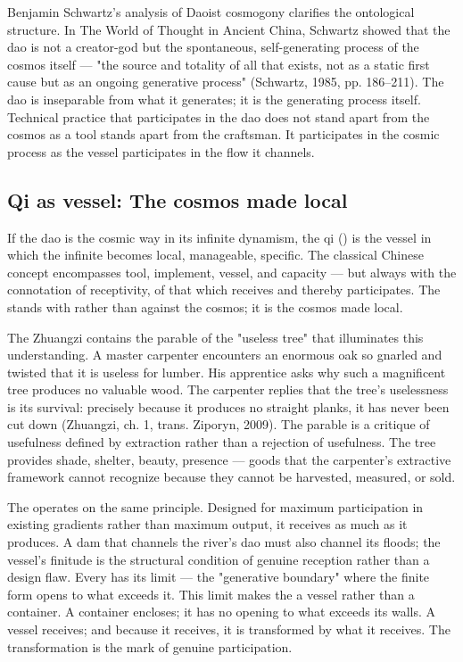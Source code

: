 Benjamin Schwartz's analysis of Daoist cosmogony clarifies the ontological structure. In The World of Thought in Ancient China, Schwartz showed that the dao is not a creator-god but the spontaneous, self-generating process of the cosmos itself — "the source and totality of all that exists, not as a static first cause but as an ongoing generative process" (Schwartz, 1985, pp. 186–211). The dao is inseparable from what it generates; it is the generating process itself. Technical practice that participates in the dao does not stand apart from the cosmos as a tool stands apart from the craftsman. It participates in the cosmic process as the vessel participates in the flow it channels.

\subsection{Qi as vessel: The cosmos made local}

If the dao is the cosmic way in its infinite dynamism, the qi () is the vessel in which the infinite becomes local, manageable, specific. The classical Chinese concept encompasses tool, implement, vessel, and capacity — but always with the connotation of receptivity, of that which receives and thereby participates. The  stands with rather than against the cosmos; it is the cosmos made local.

The Zhuangzi contains the parable of the "useless tree" that illuminates this understanding. A master carpenter encounters an enormous oak so gnarled and twisted that it is useless for lumber. His apprentice asks why such a magnificent tree produces no valuable wood. The carpenter replies that the tree's uselessness is its survival: precisely because it produces no straight planks, it has never been cut down (Zhuangzi, ch. 1, trans. Ziporyn, 2009). The parable is a critique of usefulness defined by extraction rather than a rejection of usefulness. The tree provides shade, shelter, beauty, presence — goods that the carpenter's extractive framework cannot recognize because they cannot be harvested, measured, or sold.

The  operates on the same principle. Designed for maximum participation in existing gradients rather than maximum output, it receives as much as it produces. A dam that channels the river's dao must also channel its floods; the vessel's finitude is the structural condition of genuine reception rather than a design flaw. Every  has its limit — the "generative boundary" where the finite form opens to what exceeds it. This limit makes the  a vessel rather than a container. A container encloses; it has no opening to what exceeds its walls. A vessel receives; and because it receives, it is transformed by what it receives. The transformation is the mark of genuine participation.

